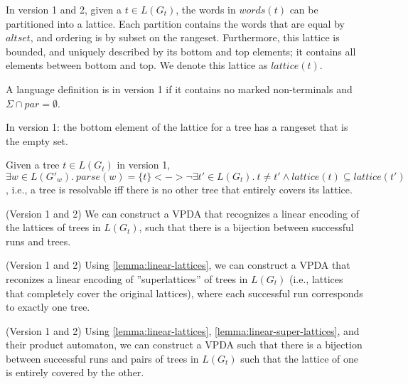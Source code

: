 \documentclass[acmsmall,review,anonymous]{acmart}\settopmatter{printfolios=true,printccs=false,printacmref=false}
\newcommand{\T}{\Sigma} %
\newcommand{\parse}{\mathit{parse}} %
\newcommand{\words}{\mathit{words}} %
\newcommand{\alt}{\mathit{alt}} %
\newcommand{\altset}{\mathit{altset}} %
\newcommand{\lattice}{\mathit{lattice}} %
\begin{document}
\begin{lemma}
In version 1 and 2, given a $t \in L(G_t)$, the words in $\words(t)$ can be partitioned into a lattice. Each partition contains the words that are equal by $\altset$, and ordering is by subset on the rangeset. Furthermore, this lattice is bounded, and uniquely described by its bottom and top elements; it contains all elements between bottom and top. We denote this lattice as $\lattice(t)$.
\label{lemma:bounded-lattice}
\end{lemma}

\begin{definition}
A language definition is in version 1 if it contains no marked non-terminals and $\T \cap \mathit{par} = \emptyset$.
\end{definition}

\begin{lemma}
In version 1: the bottom element of the lattice for a tree has a rangeset that is the empty set.
\end{lemma}

\begin{theorem}
Given a tree $t \in L(G_t)$ in version 1, $\exists w \in L(G'_w).\ \parse(w) = \{t\} <-> \neg \exists t' \in L(G_t).\ t \neq t' \land \lattice(t) \subseteq \lattice(t')$, i.e., a tree is resolvable iff there is no other tree that entirely covers its lattice.
\end{theorem}

\begin{lemma}
(Version 1 and 2) We can construct a VPDA that recognizes a linear encoding of the lattices of trees in $L(G_t)$, such that there is a bijection between successful runs and trees.
\label{lemma:linear-lattices}
\end{lemma}

\begin{lemma}
(Version 1 and 2) Using \ref{lemma:linear-lattices}, we can construct a VPDA that reconizes a linear encoding of ''superlattices'' of trees in $L(G_t)$ (i.e., lattices that completely cover the original lattices), where each successful run corresponds to exactly one tree.
\label{lemma:linear-super-lattices}
\end{lemma}

\begin{theorem}
(Version 1 and 2) Using \ref{lemma:linear-lattices}, \ref{lemma:linear-super-lattices}, and their product automaton, we can construct a VPDA such that there is a bijection between successful runs and pairs of trees in $L(G_t)$ such that the lattice of one is entirely covered by the other.
\end{theorem}
\end{document}
